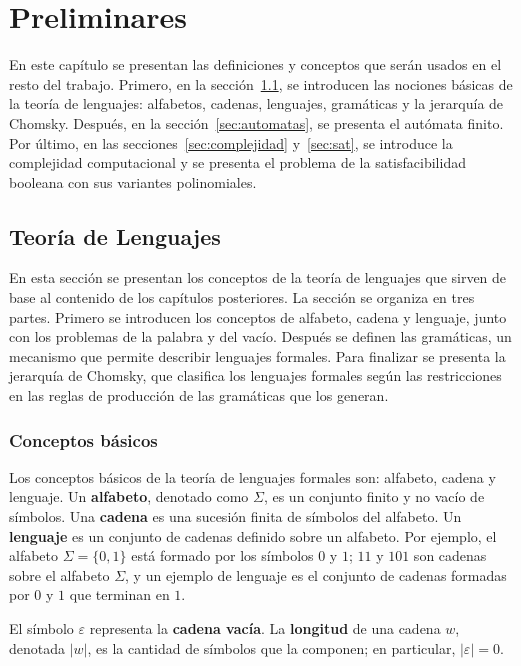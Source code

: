 \documentclass{report}
\theoremstyle{definition}
\theoremstyle{plain}
\theoremstyle{remark}
\begin{document}
\chapter{Preliminares}
\label{cap:preliminares}

En este capítulo se presentan las definiciones y conceptos que serán
usados en el resto del trabajo. Primero, en la
sección~\ref{sec:teoria-lenguajes}, se introducen las nociones
básicas de la teoría de lenguajes: alfabetos, cadenas, lenguajes,
gramáticas y la jerarquía de Chomsky. Después, en la
sección~\ref{sec:automatas}, se presenta el autómata finito. Por último,
en las secciones~\ref{sec:complejidad} y~\ref{sec:sat}, se introduce
la complejidad computacional y se presenta el problema de la
satisfacibilidad booleana con sus variantes polinomiales.

\section{Teoría de Lenguajes}
\label{sec:teoria-lenguajes}

En esta sección se presentan los conceptos de la teoría de lenguajes
que sirven de base al contenido de los capítulos posteriores. La sección
se organiza en tres partes. Primero se introducen los conceptos de
alfabeto, cadena y lenguaje, junto con los problemas de la palabra y
del vacío. Después se definen las gramáticas, un mecanismo que permite
describir lenguajes formales. Para finalizar se presenta la jerarquía
de Chomsky, que clasifica los lenguajes formales según las
restricciones en las reglas de producción de las gramáticas que los
generan.

\subsection{Conceptos básicos}

Los conceptos básicos de la teoría de lenguajes formales son: alfabeto,
cadena y lenguaje. Un \textbf{alfabeto}, denotado como $\Sigma$, es un
conjunto finito y no vacío de símbolos. Una \textbf{cadena} es una
sucesión finita de símbolos del alfabeto. Un \textbf{lenguaje} es un
conjunto de cadenas definido sobre un alfabeto. Por ejemplo, el alfabeto
$\Sigma = \{0, 1\}$ está formado por los símbolos $0$ y $1$; $11$ y $101$
son cadenas sobre el alfabeto $\Sigma$, y un ejemplo de lenguaje es el
conjunto de cadenas formadas por $0$ y $1$ que terminan en $1$.

El símbolo $\varepsilon$ representa la \textbf{cadena vacía}. La
\textbf{longitud} de una cadena $w$, denotada $|w|$, es la cantidad de
símbolos que la componen; en particular, $|\varepsilon| = 0$.
\end{document}
